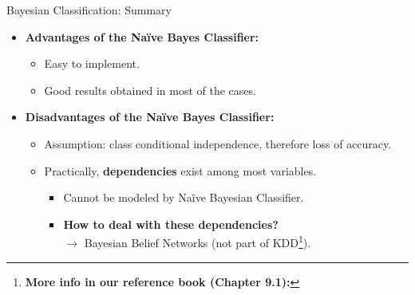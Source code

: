 \begin{frame}{Bayesian Classification: Summary}
	\begin{itemize}
		\item \textbf{Advantages of the Naïve Bayes Classifier:}
		      \begin{itemize}
			      \item Easy to implement.
			      \item Good results obtained in most of the cases.
		      \end{itemize}
		\item \textbf{Disadvantages of the Naïve Bayes Classifier:}
		      \begin{itemize}
			      \item Assumption: class conditional independence, therefore loss of accuracy.
			      \item Practically, \textbf{dependencies} exist among most variables.
			            \begin{itemize}
				            \item Cannot be modeled by Naïve Bayesian Classifier.
				            \item \textbf{\color{airforceblue}How to deal with these dependencies?} \\ $\rightarrow$ Bayesian Belief Networks (not part of KDD\footnote{\textbf{More info in our reference book (Chapter 9.1):} }).
			            \end{itemize}
		      \end{itemize}
	\end{itemize}
\end{frame}
